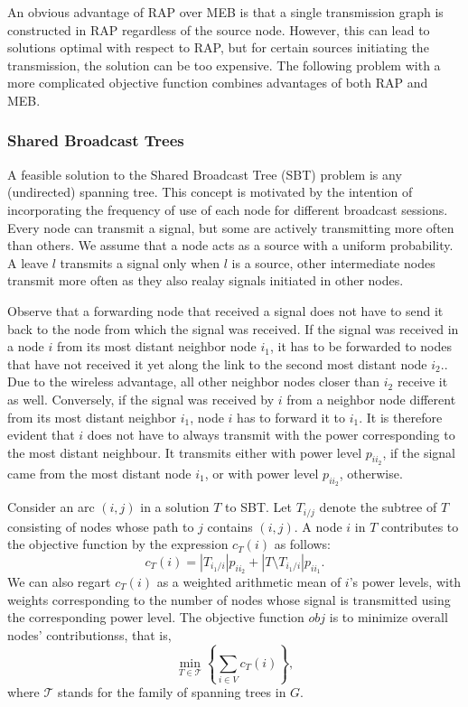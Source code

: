 An obvious advantage of RAP over MEB is that a single transmission graph is constructed in RAP regardless of the source node.
However, this can lead to solutions optimal with respect to RAP, but for certain sources initiating the transmission, the solution can be too expensive.
The following problem with a more complicated objective function combines advantages of both RAP and MEB.

\subsubsection{Shared Broadcast Trees}

A feasible solution to the Shared Broadcast Tree (SBT) problem is any (undirected) spanning tree.
This concept is motivated by the intention of incorporating the frequency of use of each node for different broadcast sessions.
Every node can transmit a signal, but some are actively transmitting more often than others.
We assume that a node acts as a source with a uniform probability. 
A leave $l$ transmits a signal only when $l$ is a source, other intermediate nodes transmit more often as they also realay signals initiated in other nodes.

Observe that a forwarding node that received a signal does not have to send it back to the node from which the signal was received.
If the signal was received in a node $i$ from its most distant neighbor node $i_1$, it has to be forwarded to nodes that have not received it yet along the link to the second most distant node $i_2$..
Due to the wireless advantage, all other neighbor nodes closer than $i_2$ receive it as well.
Conversely, if the signal was received by $i$ from a neighbor node different from its most distant neighbor $i_1$, node $i$ has to forward it to $i_1$. 
It is therefore evident that $i$ does not have to always transmit with the power corresponding to the most distant neighbour.
It transmits either with power level $p_{ii_2}$, if the signal came from the most distant node $i_1$, or with power level $p_{ii_2}$, otherwise.

Consider an arc $(i,j)$ in a solution $T$ to SBT.
Let $T_{i/j}$ denote the subtree of $T$ consisting of nodes whose path to $j$ contains $(i,j)$. 
A node $i$ in $T$ contributes to the objective function by the expression $c_T(i)$ as follows:
\begin{equation}
c_T(i)=|T_{i_1/i}|p_{ii_2} + |T\setminus T_{i_1/i}|p_{ii_1}.
\end{equation}
We can also regart $c_T(i)$ as a weighted arithmetic mean of $i$'s power levels, with weights corresponding to the number of nodes whose signal is transmitted using the corresponding power level.
The objective function $obj$ is to minimize overall nodes' contributionss, that is,
\begin{equation}
\min\limits_{T\in\mathcal{T}}\left\{\sum\limits_{i\in V}c_T(i) \right\},
\end{equation}
where $\mathcal{T}$ stands for the family of spanning trees in $G$.

